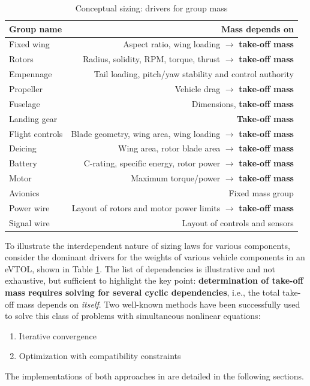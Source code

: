 \begin{center}
  \begin{table}[H]
	\caption{Conceptual sizing: drivers for group mass}
	\label{tbl:masses}
	\vspace{0.5cm}
    \begin{tabular}{ l | r }
    \hline
    Group name 		& Mass depends on \\ 
    \hline
    Fixed wing 		& Aspect ratio, wing loading $\rightarrow$ \textbf{take-off mass}\\ 
    Rotors     		& Radius, solidity, RPM, torque, thrust $\rightarrow$ \textbf{take-off mass}  \\
    Empennage  		& Tail loading, pitch/yaw stability and control authority \\
    Propeller  		& Vehicle drag $\rightarrow$ \textbf{take-off mass}\\
    Fuselage   		& Dimensions, \textbf{take-off mass} \\
    Landing gear	& \textbf{Take-off mass} \\
    Flight controls & Blade geometry, wing area, wing loading $\rightarrow$ \textbf{take-off mass} \\
    Deicing 		& Wing area, rotor blade area $\rightarrow$ \textbf{take-off mass}\\
    Battery 		& C-rating, specific energy, rotor power $\rightarrow$ \textbf{take-off mass}\\
    Motor 			& Maximum torque/power $\rightarrow$ \textbf{take-off mass}\\
    Avionics 		& Fixed mass group \\
    Power wire 		& Layout of rotors and motor power limits $\rightarrow$ \textbf{take-off mass} \\
    Signal wire 	& Layout of controls and sensors \\
    \hline
  \end{tabular}
\end{table}
\end{center}

To illustrate the interdependent nature of sizing laws for various components, consider the dominant drivers for the weights of various vehicle components in an eVTOL, shown in Table \ref{tbl:masses}. The list of dependencies is illustrative and not exhaustive, but sufficient to highlight the key point: \textbf{determination of take-off mass requires solving for several cyclic dependencies}, i.e., the total take-off mass depends on \emph{itself}. Two well-known methods have been successfully used to solve this class of problems with simultaneous nonlinear equations:
\begin{enumerate}
	\item Iterative convergence
	\item Optimization with compatibility constraints
\end{enumerate}
The implementations of both approaches in \hydra \spc are detailed in the following sections.

